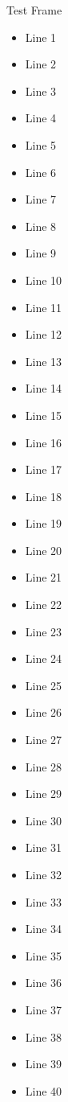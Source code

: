\documentclass{beamer}
\begin{document}
\begin{frame}[allowframebreaks]{Test Frame}
    \begin{itemize}
        \item Line 1
        \item Line 2
        \item Line 3
        \item Line 4
        \item Line 5
        \item Line 6
        \item Line 7
        \item Line 8
        \item Line 9
        \item Line 10
        \item Line 11
        \item Line 12
        \item Line 13
        \item Line 14
        \item Line 15
        \item Line 16
        \item Line 17
        \item Line 18
        \item Line 19
        \item Line 20
        \item Line 21
        \item Line 22
        \item Line 23
        \item Line 24
        \item Line 25
        \item Line 26
        \item Line 27
        \item Line 28
        \item Line 29
        \item Line 30
        \item Line 31
        \item Line 32
        \item Line 33
        \item Line 34
        \item Line 35
        \item Line 36
        \item Line 37
        \item Line 38
        \item Line 39
        \item Line 40
    \end{itemize}
\end{frame}
\end{document}
